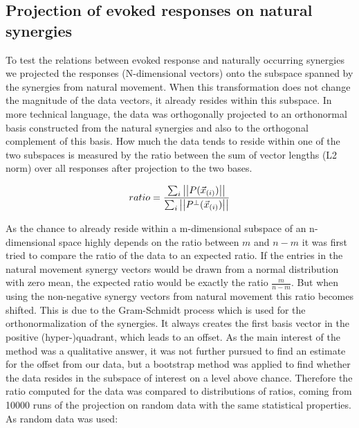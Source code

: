 \subsection{Projection of evoked responses on natural synergies} %
\label{sg:sub:projection}

To test the relations between evoked response and naturally occurring synergies we projected the responses (N-dimensional vectors) onto the subspace spanned by the synergies  from natural movement. When this transformation does not change the magnitude of the data vectors, it already resides within this subspace. In more technical language, the data was orthogonally projected to an orthonormal basis constructed from the natural synergies and also to the orthogonal complement of this basis. How much the data tends to reside within one of the two subspaces is measured by the ratio between the sum of vector lengths (L2 norm) over all responses after projection to the two bases.

\begin{equation}
	ratio = \frac
		{\sum_{i} \left|\left|P(\vec{x}_{(i)})\right|\right|} 
		{\sum_{i} \left|\left|P^{\perp}(\vec{x}_{(i)})\right|\right|}
\end{equation}

As the chance to already reside within a m-dimensional subspace of an n-dimensional space highly depends on the ratio between $m$ and $n - m$ it was first tried to compare the ratio of the data to an expected ratio. If the entries in the natural movement synergy vectors would be drawn from a normal distribution with zero mean, the expected ratio would be exactly the ratio $\frac{m}{n - m}$. But when using the non-negative synergy vectors from natural movement this ratio becomes shifted. This is due to the Gram-Schmidt process which is used for the orthonormalization of the synergies. It always creates the first basis vector in the positive (hyper-)quadrant, which leads to an offset. As the main interest of the method was a qualitative answer, it was not further pursued to find an estimate for the offset from our data, but a bootstrap method was applied to find whether the data resides in the subspace of interest on a level above chance. Therefore the ratio computed for the data was compared to distributions of ratios, coming from 10000 runs of the projection on random data with the same statistical properties. As random data was used:

